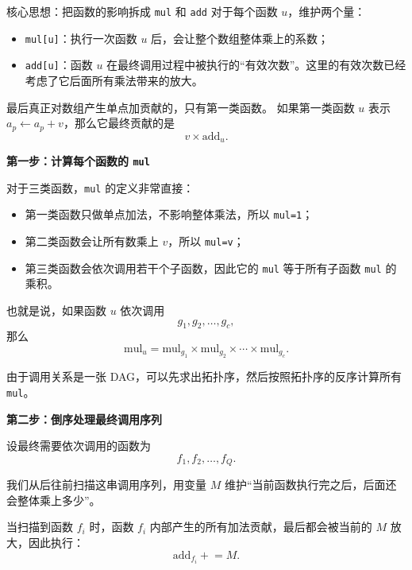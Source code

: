 \documentclass{book}
\newcommand{\code}[1]{\colorbox{codebg}{\texttt{#1}}}  %
\begin{document}
\begin{keybox}{核心思想：把函数的影响拆成 \code{mul} 和 \code{add}}
对于每个函数 $u$，维护两个量：

\begin{itemize}[leftmargin=2em,itemsep=1pt,topsep=2pt,parsep=0pt,partopsep=0pt]
    \item \code{mul[u]}：执行一次函数 $u$ 后，会让整个数组整体乘上的系数；
    \item \code{add[u]}：函数 $u$ 在最终调用过程中被执行的“有效次数”。这里的有效次数已经考虑了它后面所有乘法带来的放大。
\end{itemize}

最后真正对数组产生单点加贡献的，只有第一类函数。  
如果第一类函数 $u$ 表示 $a_p \leftarrow a_p+v$，那么它最终贡献的是
\[
v \times \mathrm{add}_u.
\]
\end{keybox}

\par\medskip
\noindent\textbf{第一步：计算每个函数的 \code{mul}}
\par\medskip

对于三类函数，\code{mul} 的定义非常直接：

\begin{itemize}[leftmargin=2em,itemsep=1pt,topsep=2pt,parsep=0pt,partopsep=0pt]
    \item 第一类函数只做单点加法，不影响整体乘法，所以 \code{mul=1}；
    \item 第二类函数会让所有数乘上 $v$，所以 \code{mul=v}；
    \item 第三类函数会依次调用若干个子函数，因此它的 \code{mul} 等于所有子函数 \code{mul} 的乘积。
\end{itemize}

也就是说，如果函数 $u$ 依次调用
\[
g_1,g_2,\ldots,g_c,
\]
那么
\[
\mathrm{mul}_u
=
\mathrm{mul}_{g_1}
\times
\mathrm{mul}_{g_2}
\times
\cdots
\times
\mathrm{mul}_{g_c}.
\]

由于调用关系是一张 DAG，可以先求出拓扑序，然后按照拓扑序的反序计算所有 \code{mul}。

\par\medskip
\noindent\textbf{第二步：倒序处理最终调用序列}
\par\medskip

设最终需要依次调用的函数为
\[
f_1,f_2,\ldots,f_Q.
\]

我们从后往前扫描这串调用序列，用变量 $M$ 维护“当前函数执行完之后，后面还会整体乘上多少”。

当扫描到函数 $f_i$ 时，函数 $f_i$ 内部产生的所有加法贡献，最后都会被当前的 $M$ 放大，因此执行：
\[
\mathrm{add}_{f_i} \mathrel{+}= M.
\]
\end{document}
